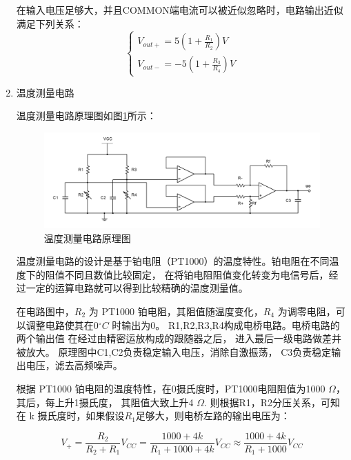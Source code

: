 \documentclass{article}
\begin{document}
\begin{spacing}{1.5}
\begin{enumerate}
        在输入电压足够大，并且COMMON端电流可以被近似忽略时，电路输出近似满足下列关系：
        \begin{equation}
            \begin{cases}
                V_{out+} = 5(1+\frac{R_1}{R_2}) V \\
                V_{out-} = -5(1+\frac{R_3}{R_4}) V
            \end{cases}
        \end{equation}

        \item 温度测量电路
        
        温度测量电路原理图如图\ref{fig:design_prin_3}所示：

        \begin{figure}[H]
            \centering
            \includegraphics[scale=0.4]{fig/design/principle3.png}
            \caption{温度测量电路原理图}
            \label{fig:design_prin_3}
        \end{figure}

        温度测量电路的设计是基于铂电阻（PT1000）的温度特性。铂电阻在不同温度下的阻值不同且数值比较固定，
        在将铂电阻阻值变化转变为电信号后，经过一定的运算电路就可以得到比较精确的温度测量值。

        在电路图中，$R_2$ 为 PT1000 铂电阻，其阻值随温度变化，$R_4$ 为调零电阻，可以调整电路使其在0$^{\circ}C$ 
        时输出为0。
        R1,R2,R3,R4构成电桥电路。电桥电路的两个输出值
        在经过由精密运放构成的跟随器之后，
        进入最后一级电路做差并被放大。
        原理图中C1,C2负责稳定输入电压，消除自激振荡，
        C3负责稳定输出电压，滤去高频噪声。
        
        根据 PT1000 铂电阻的温度特性，在0摄氏度时，PT1000电阻阻值为1000 $\Omega$，其后，每上升1摄氏度，
        其阻值大致上升4 $\Omega$. 则根据R1，R2分压关系，可知在 k 摄氏度时，如果假设$R_1$足够大，则电桥左路的输出电压为：

        \begin{equation}
            V_{+} = \frac{R_2}{R_2 + R_1} V_{CC} = \frac{1000+4k}{R_1 + 1000 + 4k} V_{CC} \approx \frac{1000+4k}{R_1 + 1000 } V_{CC} \label{equ:approx}
        \end{equation}


\end{enumerate}
\end{spacing}
\end{document}
